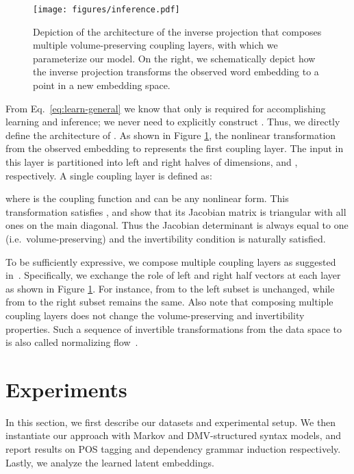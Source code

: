 \documentclass[11pt,a4paper]{article}
\begin{document}
\begin{figure}[!t]
\centering
    \texttt{[image: figures/inference.pdf]}
    \caption{Depiction of the architecture of the inverse projection  that composes multiple volume-preserving coupling layers, with which we parameterize our model. On the right, we schematically depict how the inverse projection transforms the observed word embedding  to a point  in a new embedding space.}
    \label{fig:opt}
\vspace{-5mm}
\end{figure}

From Eq.~\eqref{eq:learn-general} we know that only  is required for accomplishing learning and inference; we never need to explicitly construct . Thus, we directly define the architecture of . As shown in Figure \ref{fig:opt}, the nonlinear transformation from the observed embedding  to  represents the first coupling layer. The input in this layer is partitioned into left and right halves of dimensions,  and ,  respectively. A single coupling layer is defined as:

where  is the coupling function and can be any nonlinear form. This transformation satisfies , and \citet{dinh2014nice} show that its Jacobian matrix is triangular with all ones on the main diagonal. Thus the Jacobian determinant is always equal to one (i.e.~volume-preserving) and the invertibility condition is naturally satisfied. 

To be sufficiently expressive, we compose multiple coupling layers as suggested in~\citet{dinh2014nice}. Specifically, we exchange the role of left and right half vectors at each layer as shown in Figure \ref{fig:opt}. For instance, from  to  the left subset  is unchanged, while from  to  the right subset  remains the same. Also note that composing multiple coupling layers does not change the volume-preserving and invertibility properties. Such a sequence of invertible transformations from the data space  to  is also called normalizing flow~\citep{rezende2015variational}.





\section{Experiments}
In this section, we first describe our datasets and experimental setup. We then instantiate our approach with Markov and DMV-structured syntax models, and report results on POS tagging and dependency grammar induction respectively. Lastly, we analyze the learned latent embeddings. 
\end{document}
